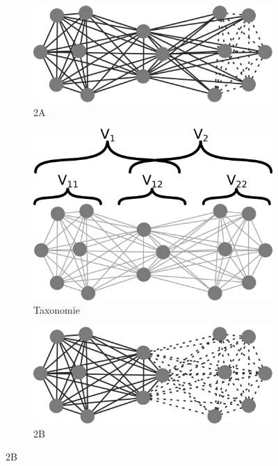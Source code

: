 \begin{figure}[h]
\centering
	\begin{subfigure}[b]{0.3\linewidth}
		\includegraphics[width=\linewidth]{img/ExpectedNodes/2Cliques/PartitionExamples/Clique2A}
		\caption{2A\label{fig:2C2A}}	
	\end{subfigure}	
	\begin{subfigure}[b]{0.3\linewidth}
		\includegraphics[width=\linewidth]{img/ExpectedNodes/2Cliques/PartitionExamples/Clique2}
		\caption{Taxonomie\label{fig:2Ctaxo}}	
	\end{subfigure}	
	\begin{subfigure}[b]{0.3\linewidth}
			\includegraphics[width=\linewidth]{img/ExpectedNodes/2Cliques/PartitionExamples/Clique2B}
			\caption{2B\label{fig:2C2B}}		
	\end{subfigure}


\end{figure}
